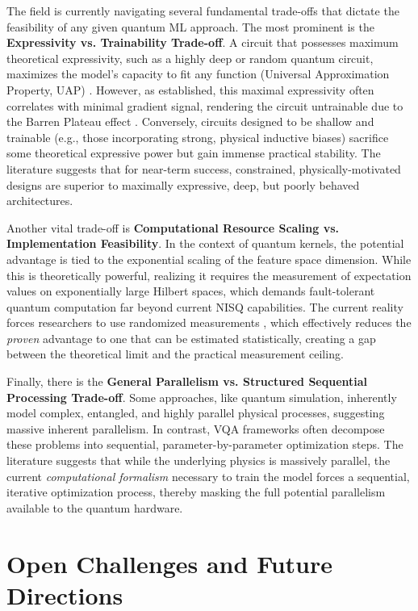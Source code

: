 \documentclass{article}
\begin{document}
The field is currently navigating several fundamental trade-offs that dictate the feasibility of any given quantum ML approach. The most prominent is the \textbf{Expressivity vs. Trainability Trade-off}. A circuit that possesses maximum theoretical expressivity, such as a highly deep or random quantum circuit, maximizes the model's capacity to fit any function (Universal Approximation Property, UAP) \cite{goto2021universal}. However, as established, this maximal expressivity often correlates with minimal gradient signal, rendering the circuit untrainable due to the Barren Plateau effect \cite{cerezo2021cost}. Conversely, circuits designed to be shallow and trainable (e.g., those incorporating strong, physical inductive biases) sacrifice some theoretical expressive power but gain immense practical stability. The literature suggests that for near-term success, constrained, physically-motivated designs are superior to maximally expressive, deep, but poorly behaved architectures.

Another vital trade-off is \textbf{Computational Resource Scaling vs. Implementation Feasibility}. In the context of quantum kernels, the potential advantage is tied to the exponential scaling of the feature space dimension. While this is theoretically powerful, realizing it requires the measurement of expectation values on exponentially large Hilbert spaces, which demands fault-tolerant quantum computation far beyond current NISQ capabilities. The current reality forces researchers to use randomized measurements \cite{haug2023quantum}, which effectively reduces the \textit{proven} advantage to one that can be estimated statistically, creating a gap between the theoretical limit and the practical measurement ceiling.

Finally, there is the \textbf{General Parallelism vs. Structured Sequential Processing Trade-off}. Some approaches, like quantum simulation, inherently model complex, entangled, and highly parallel physical processes, suggesting massive inherent parallelism. In contrast, VQA frameworks often decompose these problems into sequential, parameter-by-parameter optimization steps. The literature suggests that while the underlying physics is massively parallel, the current \textit{computational formalism} necessary to train the model forces a sequential, iterative optimization process, thereby masking the full potential parallelism available to the quantum hardware.

\section{Open Challenges and Future Directions}
\end{document}
